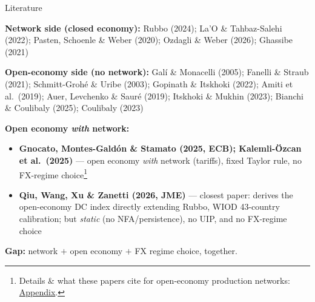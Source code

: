 \documentclass[aspectratio=43, 10pt]{beamer}
\begin{document}
\begin{frame}{Literature}

{\footnotesize \textbf{Network side (closed economy):}} {\scriptsize Rubbo (2024); La'O \& Tahbaz-Salehi (2022); Pasten, Schoenle \& Weber (2020); Ozdagli \& Weber (2026); Ghassibe (2021)}

\vspace{10pt}
{\footnotesize \textbf{Open-economy side (no network):}} {\scriptsize Gal\'i \& Monacelli (2005); Fanelli \& Straub (2021); Schmitt-Grohé \& Uribe (2003); Gopinath \& Itskhoki (2022); Amiti et al.\ (2019); Auer, Levchenko \& Sauré (2019); Itskhoki \& Mukhin (2023); Bianchi \& Coulibaly (2025); Coulibaly (2023)}

\vspace{10pt}

{\footnotesize \textbf{Open economy \emph{with} network:}}
{\scriptsize
\begin{itemize}\setlength{\itemsep}{2pt}\setlength{\topsep}{1pt}
\item \textbf{Gnocato, Montes-Gald\'on \& Stamato (2025, ECB); Kalemli-\"Ozcan et al.\ (2025)} --- open economy \emph{with} network (tariffs), fixed Taylor rule, no FX-regime choice\footnote{\tiny Details \& what these papers cite for open-economy production networks: \hyperlink{ecbnetwork}{Appendix}.}
\item \textbf{Qiu, Wang, Xu \& Zanetti (2026, JME)} --- closest paper: derives the open-economy DC index directly extending Rubbo, WIOD 43-country calibration; but \emph{static} (no NFA/persistence), no UIP, and no FX-regime choice
\end{itemize}}

\vspace{2pt}
{\scriptsize \textbf{Gap:} network $+$ open economy $+$ FX regime choice, together.}

\end{frame}
\end{document}
